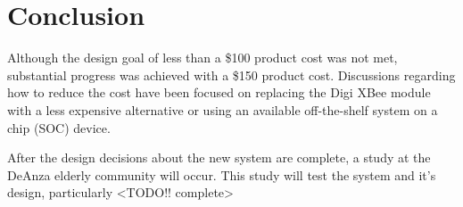 \documentclass[journal,compsoc]{IEEEtran}
\begin{document}

\section{Conclusion}

Although the design goal of less than a \$100 product cost was not met, substantial progress was achieved with a \$150 product cost. Discussions regarding how to reduce the cost have been focused on replacing the Digi XBee module with a less expensive alternative or using an available off-the-shelf system on a chip (SOC) device.

After the design decisions about the new system are complete, a study at the DeAnza elderly community will occur. This study will test the system and it's design, particularly <TODO!! complete>

%
%
%
\appendices
\end{document}
